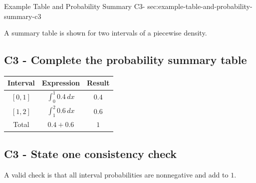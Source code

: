 	\sectionScored
	{Example Table and Probability Summary}
	{C3-}
	{sec:example-table-and-probability-summary-c3}
	{
	A summary table is shown for two intervals of a piecewise density.
	
	
	\label{subsec:example-table-and-probability-summary-c3-a}
	\subsection*{C3 - Complete the probability summary table }
	
	\begin{minipage}[t]{0.42\textwidth}
		\vspace{0pt}
		\centering
	\end{minipage}
	\hfill
	\begin{minipage}[t]{0.54\textwidth}
		\vspace{0pt}
		\centering
		
		\begin{tabular}{|c|c|c|}
			\hline
			Interval & Expression & Result \\
			\hline
			$[0,1]$ & $\int_0^1 0.4\,dx$ & $0.4$ \\
			$[1,2]$ & $\int_1^2 0.6\,dx$ & $0.6$ \\
			\hline
			Total & $0.4+0.6$ & $1$ \\
			\hline
		\end{tabular}
		
	\end{minipage}
	
	\vspace{-5mm}
	
	\label{subsec:example-table-and-probability-summary-c3-b}
	\subsection*{C3 - State one consistency check }
	
	A valid check is that all interval probabilities are nonnegative and add to $1$.
	
	}
	




